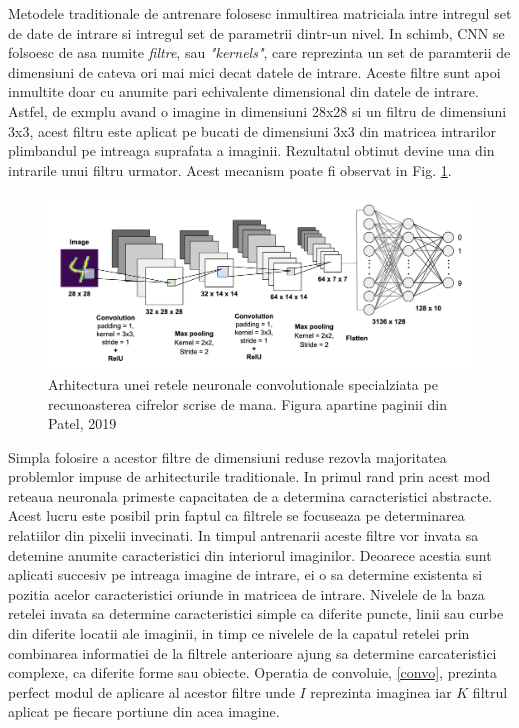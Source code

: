 \documentclass[a4paper,12pt]{book}
\begin{document}
				Metodele traditionale de antrenare folosesc inmultirea matriciala intre intregul set de date de intrare si intregul set de parametrii dintr-un nivel. In schimb, CNN se folsoesc de asa numite \textit{filtre}, sau \textit{"kernels"}, care reprezinta un set de paramterii de dimensiuni de cateva ori mai mici decat datele de intrare. Aceste filtre sunt apoi inmultite doar cu anumite pari echivalente dimensional din datele de intrare. Astfel, de exmplu avand o imagine in dimensiuni 28x28 si un filtru de dimensiuni 3x3, acest filtru este aplicat pe bucati de dimensiuni 3x3 din matricea intrarilor plimbandul pe intreaga suprafata a imaginii. Rezultatul obtinut devine una din intrarile unui filtru urmator. Acest mecanism poate fi observat in Fig. \ref{fig:cnns}.
					
				\begin{figure}[h]
					\centering
					\includegraphics[scale=0.23]{cnns}
					\caption{Arhitectura unei retele neuronale convolutionale specialziata pe recunoasterea cifrelor scrise de mana. Figura apartine paginii din Patel, 2019 \cite{cnn_photo}}
					\label{fig:cnns}
				\end{figure}
				
				Simpla folosire a acestor filtre de dimensiuni reduse rezovla majoritatea problemlor impuse de arhitecturile traditionale. In primul rand prin acest mod reteaua neuronala primeste capacitatea de a determina caracteristici abstracte. Acest lucru este posibil prin faptul ca filtrele se focuseaza pe determinarea relatiilor din pixelii invecinati. In timpul antrenarii aceste filtre vor invata sa detemine anumite caracteristici din interiorul imaginilor. Deoarece acestia sunt aplicati succesiv pe intreaga imagine de intrare, ei o sa determine existenta si pozitia acelor caracteristici oriunde in matricea de intrare. Nivelele de la baza retelei invata sa determine caracteristici simple ca diferite puncte, linii sau curbe din diferite locatii ale imaginii, in timp ce nivelele de la capatul retelei prin combinarea informatiei de la filtrele anterioare ajung sa determine carcateristici complexe, ca diferite forme sau obiecte. Operatia de convoluie, \ref{convo}, prezinta perfect modul de aplicare al acestor filtre unde $I$ reprezinta imaginea iar $K$ filtrul aplicat pe fiecare portiune din acea imagine.\par
				
\end{document}
